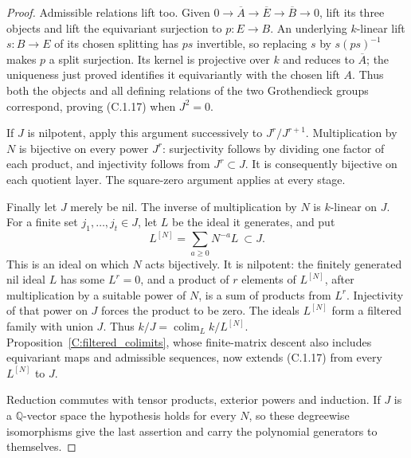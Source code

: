 \begin{proof}
Admissible relations lift too. Given
$0\to\overline A\to\overline E\to\overline B\to0$, lift its
three objects and lift the equivariant surjection to $p:E\to B$.
An underlying $k$-linear lift $s:B\to E$ of its chosen splitting
has $ps$ invertible, so replacing $s$ by $s(ps)^{-1}$ makes
$p$ a split surjection. Its kernel is projective over $k$ and
reduces to $\overline A$; the uniqueness just proved identifies
it equivariantly with the chosen lift $A$. Thus both the objects
and all defining relations of the two Grothendieck groups
correspond, proving (C.1.17) when $J^2=0$.

If $J$ is nilpotent, apply this argument successively to
$J^r/J^{r+1}$. Multiplication by $N$ is bijective on every power
$J^r$: surjectivity follows by dividing one factor of each product,
and injectivity follows from $J^r\subset J$. It is consequently
bijective on each quotient layer. The square-zero argument applies
at every stage.

Finally let $J$ merely be nil. The inverse of multiplication by
$N$ is $k$-linear on $J$. For a finite set $j_1,\ldots,j_t\in J$,
let $L$ be the ideal it generates, and put
\[
 L^{[N]}=\sum_{a\geq0}N^{-a}L\ \subset J.
\]
This is an ideal on which $N$ acts bijectively. It is nilpotent:
the finitely generated nil ideal $L$ has some $L^r=0$, and a
product of $r$ elements of $L^{[N]}$, after multiplication by a
suitable power of $N$, is a sum of products from $L^r$.
Injectivity of that power on $J$ forces the product to be zero.
The ideals $L^{[N]}$ form a filtered family with union $J$.
Thus $k/J=\operatorname*{colim}_L k/L^{[N]}$.
Proposition~\ref{C:filtered_colimits}, whose finite-matrix descent
also includes equivariant maps and admissible sequences, now
extends (C.1.17) from every $L^{[N]}$ to $J$.

Reduction commutes with tensor products, exterior powers and
induction. If $J$ is a $\mathbb Q$-vector space the hypothesis
holds for every $N$, so these degreewise isomorphisms give the
last assertion and carry the polynomial generators to themselves.
\end{proof}

